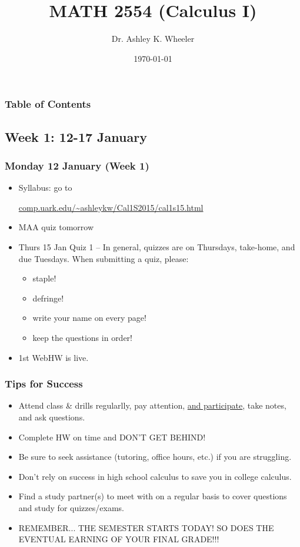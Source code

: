 \documentclass[14pt]{beamer}
\title[Cal I S2015]{MATH 2554 (Calculus I)}
\subtitle{}
\author[Wheeler]{Dr. Ashley K. Wheeler}
\institute{University of Arkansas}
\date{\today}
\begin{document}
\maketitle

\begin{frame}
\frametitle{Table of Contents}
\tableofcontents
\end{frame}

\begin{frame}
\section[Week 1]{Week 1: 12-17 January}
\frametitle{Monday 12 January (Week 1)}
\begin{itemize}
\item Syllabus: go to 

{\footnotesize\url{comp.uark.edu/~ashleykw/Cal1S2015/cal1s15.html}}
\item MAA quiz tomorrow
\item Thurs 15 Jan Quiz 1 -- In general, quizzes are on Thursdays, take-home, and due Tuesdays.  When submitting a quiz, please:
	\begin{itemize}
	\item staple!
	\item defringe!
	\item write your name on every page!
	\item keep the questions in order!
	\end{itemize}
\item 1st WebHW is live.
\end{itemize}
\end{frame}

\begin{frame}
\frametitle{Tips for Success}
\small
\begin{itemize}
\item Attend class \& drills regularlly, pay attention, \uline{and participate}, take notes, and ask questions.
\item Complete HW on time and DON'T GET BEHIND!
\item Be sure to seek assistance (tutoring, office hours, etc.) if you are struggling.
\item Don't rely on success in high school calculus to save you in college calculus.
\item Find a study partner(s) to meet with on a regular basis to cover questions and study for quizzes/exams.
\item REMEMBER... THE SEMESTER STARTS TODAY!  SO DOES THE EVENTUAL EARNING OF YOUR FINAL GRADE!!!
\end{itemize}
\end{frame}
\end{document}

